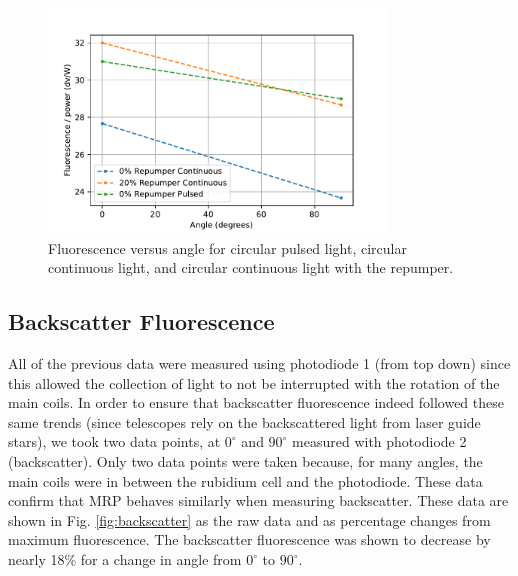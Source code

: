 \begin{figure}[htpb]
	\centering
	\includegraphics[width=0.8\textwidth]{../../MRPData/Repumping/transat.pdf}
	\caption{Fluorescence versus angle for circular pulsed light, circular continuous light, and circular continuous light with the repumper.}
	\label{fig:flvanglerepump}
\end{figure}

\subsection{Backscatter Fluorescence}
All of the previous data were measured using photodiode 1 (from top down) since this allowed the collection of light to not be interrupted with the rotation of the main coils. In order to ensure that backscatter fluorescence indeed followed these same trends (since telescopes rely on the backscattered light from laser guide stars), we took two data points, at $0^{\circ}$ and $90^{\circ}$ measured with photodiode 2 (backscatter). Only two data points were taken because, for many angles, the main coils were in between the rubidium cell and the photodiode. These data confirm that MRP behaves similarly when measuring backscatter. These data are shown in Fig. \ref{fig:backscatter} as the raw data and as percentage changes from maximum fluorescence. The backscatter fluorescence was shown to decrease by nearly 18\% for a change in angle from $0^{\circ}$ to $90^{\circ}$.

